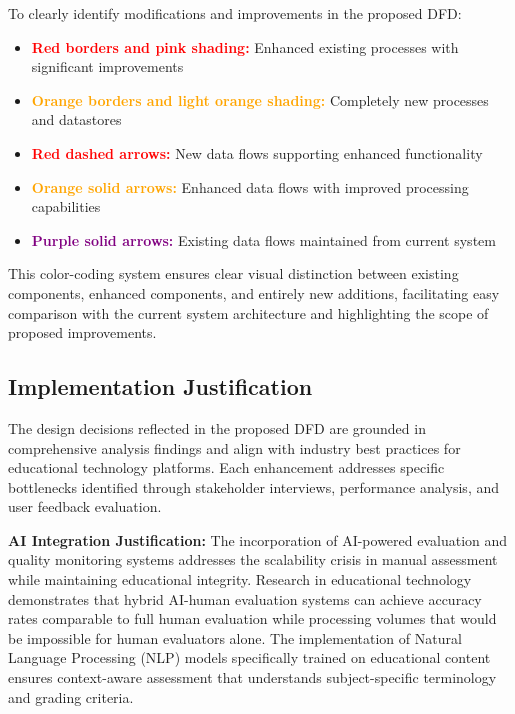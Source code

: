 \documentclass[12pt,a4paper,oneside]{book}
\begin{document}
To clearly identify modifications and improvements in the proposed DFD:

\begin{itemize}
    \item \textbf{\textcolor{red}{Red borders and pink shading:}} Enhanced existing processes with significant improvements
    \item \textbf{\textcolor{orange}{Orange borders and light orange shading:}} Completely new processes and datastores
    \item \textbf{\textcolor{red}{Red dashed arrows:}} New data flows supporting enhanced functionality
    \item \textbf{\textcolor{orange}{Orange solid arrows:}} Enhanced data flows with improved processing capabilities
    \item \textbf{\textcolor{purple}{Purple solid arrows:}} Existing data flows maintained from current system
\end{itemize}

This color-coding system ensures clear visual distinction between existing components, enhanced components, and entirely new additions, facilitating easy comparison with the current system architecture and highlighting the scope of proposed improvements.

\subsection{Implementation Justification}

The design decisions reflected in the proposed DFD are grounded in comprehensive analysis findings and align with industry best practices for educational technology platforms. Each enhancement addresses specific bottlenecks identified through stakeholder interviews, performance analysis, and user feedback evaluation.

\textbf{AI Integration Justification:}
The incorporation of AI-powered evaluation and quality monitoring systems addresses the scalability crisis in manual assessment while maintaining educational integrity. Research in educational technology demonstrates that hybrid AI-human evaluation systems can achieve accuracy rates comparable to full human evaluation while processing volumes that would be impossible for human evaluators alone. The implementation of Natural Language Processing (NLP) models specifically trained on educational content ensures context-aware assessment that understands subject-specific terminology and grading criteria.
\end{document}
